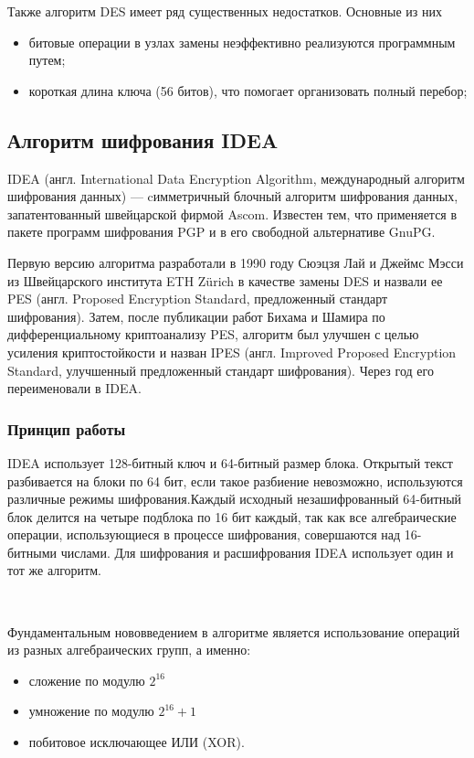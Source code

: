 \documentclass[a4paper]{report}
\begin{document}
Также алгоритм DES имеет ряд существенных недостатков. Основные из них 
\begin{itemize}
\item битовые операции в узлах замены неэффективно реализуются программ­ным путем;
\item  короткая длина ключа (56 битов), что помогает организо­вать полный перебор;
\end{itemize}

\subsection{Алгоритм шифрования IDEA}
IDEA (англ. International Data Encryption Algorithm, международный алгоритм шифрования данных) — cимметричный блочный алгоритм шифрования данных, запатентованный швейцарской фирмой Ascom. Известен тем, что применяется в пакете программ шифрования PGP и в его свободной альтернативе GnuPG.

Первую версию алгоритма разработали в 1990 году Сюэцзя Лай и Джеймс Мэсси из Швейцарского института ETH Zürich в качестве замены DES и назвали ее PES (англ. Proposed Encryption Standard, предложенный стандарт шифрования). Затем, после публикации работ Бихама и Шамира по дифференциальному криптоанализу PES, алгоритм был улучшен с целью усиления криптостойкости и назван IPES (англ. Improved Proposed Encryption Standard, улучшенный предложенный стандарт шифрования). Через год его переименовали в IDEA.

\subsubsection{Принцип работы}

IDEA использует 128-битный ключ и 64-битный размер блока. Открытый текст разбивается на блоки по 64 бит, если такое разбиение невозможно, используются различные режимы шифрования.Каждый исходный незашифрованный 64-битный блок делится на четыре подблока по 16 бит каждый, так как все алгебраические операции, использующиеся в процессе шифрования, совершаются над 16-битными числами. Для шифрования и расшифрования IDEA использует один и тот же алгоритм.

~

Фундаментальным нововведением в алгоритме является использование операций из разных алгебраических групп, а именно:
\begin{itemize}
\item сложение по модулю $2^{16}$
\item умножение по модулю $2^{16}+1$
\item побитовое исключающее ИЛИ (XOR).
\end{itemize}
\end{document}
